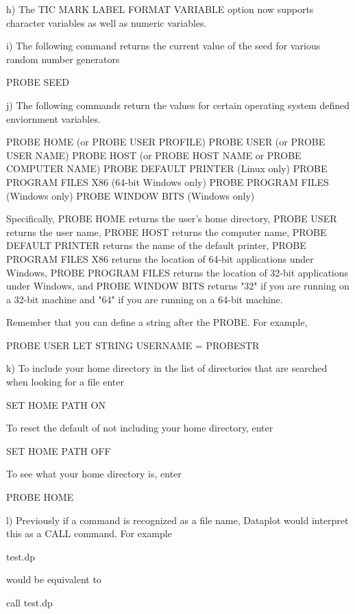     h) The TIC MARK LABEL FORMAT VARIABLE option now supports
       character variables as well as numeric variables.

    i) The following command returns the current value of the
       seed for various random number generators

           PROBE SEED

    j) The following commands return the values for certain
       operating system defined enviornment variables.

           PROBE HOME  (or PROBE USER PROFILE)
           PROBE USER  (or PROBE USER NAME)
           PROBE HOST  (or PROBE HOST NAME or PROBE COMPUTER NAME)
           PROBE DEFAULT PRINTER (Linux only)
           PROBE PROGRAM FILES X86 (64-bit Windows only)
           PROBE PROGRAM FILES     (Windows only)
           PROBE WINDOW BITS       (Windows only)

      Specifically, PROBE HOME returns the user's home directory,
      PROBE USER returns the user name, PROBE HOST returns the computer
      name, PROBE DEFAULT PRINTER returns the name of the default
      printer, PROBE PROGRAM FILES X86 returns the location of
      64-bit applications under Windows, PROBE PROGRAM FILES returns
      the location of 32-bit applications under Windows, and
      PROBE WINDOW BITS returns "32" if you are running on a
      32-bit machine and "64" if you are running on a 64-bit
      machine.

      Remember that you can define a string after the PROBE.  For
      example,

          PROBE USER
          LET STRING USERNAME = PROBESTR

    k) To include your home directory in the list of directories that
       are searched when looking for a file enter

          SET HOME PATH ON

       To reset the default of not including your home directory, enter

          SET HOME PATH OFF

       To see what your home directory is, enter

          PROBE HOME

    l) Previously if a command is recognized as a file name, Dataplot
       would interpret this as a CALL command.  For example

           test.dp

       would be equivalent to

           call test.dp

